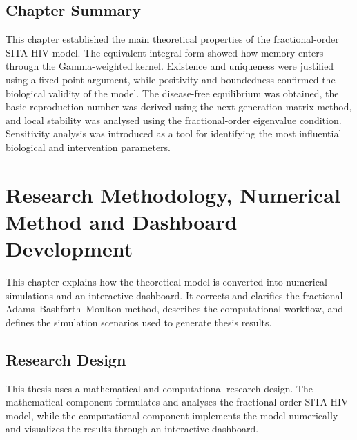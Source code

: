\section{Chapter Summary}

This chapter established the main theoretical properties of the fractional-order SITA HIV model. The equivalent integral form showed how memory enters through the Gamma-weighted kernel. Existence and uniqueness were justified using a fixed-point argument, while positivity and boundedness confirmed the biological validity of the model. The disease-free equilibrium was obtained, the basic reproduction number was derived using the next-generation matrix method, and local stability was analysed using the fractional-order eigenvalue condition. Sensitivity analysis was introduced as a tool for identifying the most influential biological and intervention parameters.

\chapter{Research Methodology, Numerical Method and Dashboard Development}

\begin{remarkbox}[title={Purpose of this chapter}]
This chapter explains how the theoretical model is converted into numerical simulations and an interactive dashboard. It corrects and clarifies the fractional Adams--Bashforth--Moulton method, describes the computational workflow, and defines the simulation scenarios used to generate thesis results.
\end{remarkbox}

\section{Research Design}

This thesis uses a mathematical and computational research design. The mathematical component formulates and analyses the fractional-order SITA HIV model, while the computational component implements the model numerically and visualizes the results through an interactive dashboard.


